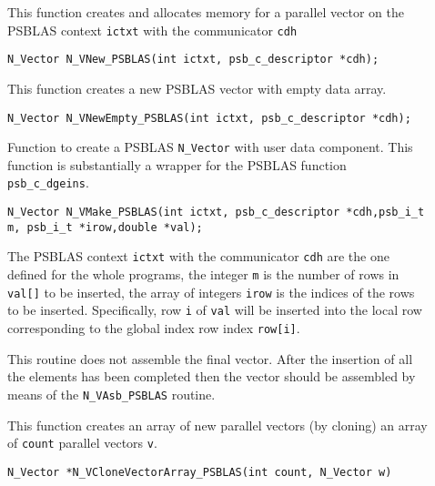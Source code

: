 \documentclass[twoside,a4paper]{refart}
\begin{document}
\begin{description}
	\item[] This function creates and allocates memory for a parallel vector
	on the PSBLAS context \lstinline[style=CStyle]|ictxt| with the communicator \lstinline[style=CStyle]|cdh|
	
	 \lstinline[style=CStyle]|N_Vector N_VNew_PSBLAS(int ictxt, psb_c_descriptor *cdh);|
	
	\item[] This function creates a new PSBLAS vector with empty data array.
	
	 \lstinline[style=CStyle]|N_Vector N_VNewEmpty_PSBLAS(int ictxt, psb_c_descriptor *cdh);|
	
	\item[] Function to create a PSBLAS \texttt{N\_Vector} with user data component. This function is substantially a wrapper for the PSBLAS function \lstinline[style=CStyle]|psb_c_dgeins|.
	
	 \lstinline[style=CStyle]|N_Vector N_VMake_PSBLAS(int ictxt, psb_c_descriptor *cdh,psb_i_t m, psb_i_t *irow,double *val);|
	
	The PSBLAS context \lstinline[style=CStyle]|ictxt| with the communicator \lstinline[style=CStyle]|cdh| are the one defined for the whole programs, the integer \lstinline[style=CStyle]{m} is the number of rows in \lstinline[style=CStyle]{val[]} to be inserted, the array of integers \lstinline[style=CStyle]{irow} is the indices of the rows to be inserted. Specifically, row \lstinline[style=CStyle]|i| of \lstinline[style=CStyle]|val| will be inserted into the local row corresponding to the global index row index \lstinline[style=CStyle]|row[i]|.
	
	\attention This routine does not assemble the final vector. After the insertion of all the elements has been completed then the vector should be assembled by means of the \texttt{N\_VAsb\_PSBLAS} routine.
	
	\item[] This function creates an array of new parallel vectors (by cloning) an array of \lstinline[style=CStyle]|count| parallel vectors \lstinline[style=CStyle]|v|.
	
	 \lstinline[style=CStyle]|N_Vector *N_VCloneVectorArray_PSBLAS(int count, N_Vector w)|
	

\end{description}
\end{document}
